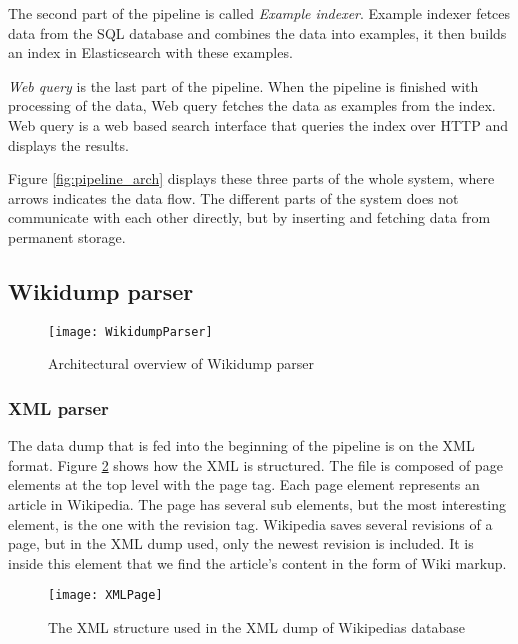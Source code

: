 The second part of the pipeline is called \textit{Example indexer}. Example indexer fetces data from the SQL database and combines the data into examples, it then builds an index in Elasticsearch with these examples.


\textit{Web query} is the last part of the pipeline. When the pipeline is finished with processing of the data, Web query fetches the data as examples from the index. Web query is a web based search interface that queries the index over HTTP and displays the results.

Figure \ref{fig:pipeline_arch} displays these three parts of the whole system, where arrows indicates the data flow. The different parts of the system does not communicate with each other directly, but by inserting and fetching data from permanent storage. 


\subsection{Wikidump parser}

\begin{figure}[h]
\caption{Architectural overview of Wikidump parser}
\texttt{[image: WikidumpParser]}
\label{fig:wikidump_parser}
\end{figure}

\subsubsection{XML parser}

The data dump that is fed into the beginning of the pipeline is on the XML format. Figure \ref{fig:xml} shows how the XML is structured. The file is composed of page elements at the top level with the page tag. Each page element represents an article in Wikipedia. The page has several sub elements, but the most interesting element, is the one with the revision tag. Wikipedia saves several revisions of a page, but in the XML dump used, only the newest revision is included. It is inside this element that we find the article's content in the form of Wiki markup.

\begin{figure}[h]
\caption{The XML structure used in the XML dump of Wikipedias database}
\texttt{[image: XMLPage]}
\label{fig:xml}
\end{figure}

